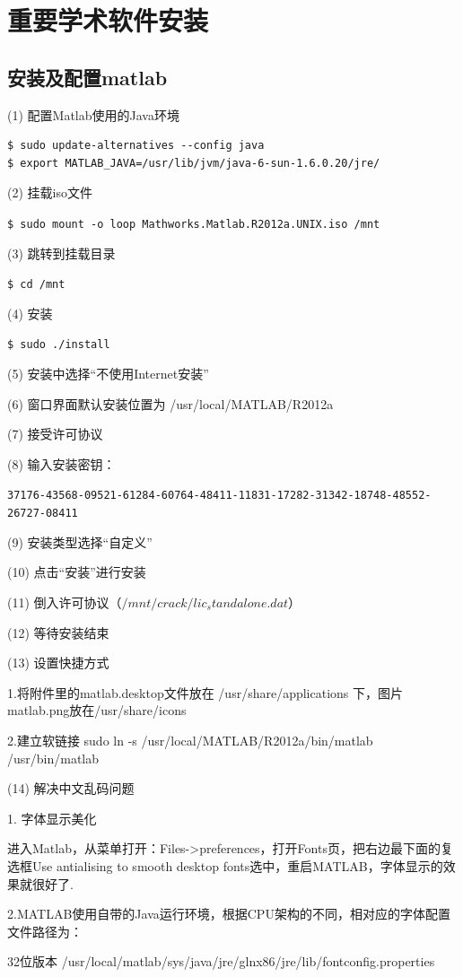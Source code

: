 \section{重要学术软件安装}
\subsection{安装及配置matlab}
(1) 配置Matlab使用的Java环境
\begin{verbatim}
$ sudo update-alternatives --config java
$ export MATLAB_JAVA=/usr/lib/jvm/java-6-sun-1.6.0.20/jre/
\end{verbatim}

(2) 挂载iso文件 

\verb"$ sudo mount -o loop Mathworks.Matlab.R2012a.UNIX.iso /mnt"

(3) 跳转到挂载目录

\verb"$ cd /mnt"

(4) 安装 

\verb"$ sudo ./install"

(5) 安装中选择“不使用Internet安装”

(6) 窗口界面默认安装位置为 /usr/local/MATLAB/R2012a

(7) 接受许可协议

(8) 输入安装密钥：

\verb"37176-43568-09521-61284-60764-48411-11831-17282-31342-18748-48552-26727-08411"

(9) 安装类型选择“自定义”

(10) 点击“安装”进行安装

(11) 倒入许可协议（$/mnt/crack/lic_standalone.dat$）

(12) 等待安装结束

(13) 设置快捷方式

1.将附件里的matlab.desktop文件放在 /usr/share/applications 下，图片matlab.png放在/usr/share/icons

2.建立软链接 sudo ln -s /usr/local/MATLAB/R2012a/bin/matlab /usr/bin/matlab

(14) 解决中文乱码问题

1. 字体显示美化 

进入Matlab，从菜单打开：Files->preferences，打开Fonts页，把右边最下面的复选框Use antialising to smooth desktop fonts选中，重启MATLAB，字体显示的效果就很好了.

2.MATLAB使用自带的Java运行环境，根据CPU架构的不同，相对应的字体配置文件路径为：

32位版本 /usr/local/matlab/sys/java/jre/glnx86/jre/lib/fontconfig.properties

